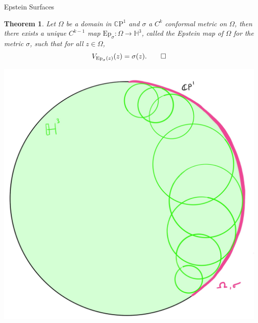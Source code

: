 \documentclass[professionalfont]{beamer}
\newcommand{\CP}{\mathbb{C}\mathrm{P}}
\renewcommand{\H}{\mathbb{H}}
\newtheorem{thm}{Theorem}[section]
\begin{document}
\begin{frame}{Epstein Surfaces}


\begin{thm}
Let $\Omega$ be a domain in $\CP^1$  and $\sigma$ a $C^k$ conformal metric on $\Omega$, then there exists a unique $C^{k-1}$ map $\mathrm{Ep}_\sigma : \Omega \to \H^3$, called the Epstein map of $\Omega$ for the metric $\sigma$, such that for all $z \in \Omega$,
\[
V_{\mathrm{Ep}_\sigma(z)}(z) = \sigma(z). \qed
\]
\end{thm}


\centering\includegraphics[scale=0.07]{Epstein-2.jpg}

\end{frame}


\end{document}

